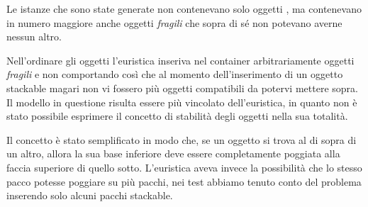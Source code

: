 Le istanze che sono state generate non contenevano solo oggetti , ma contenevano in numero maggiore anche oggetti \textit{fragili} che sopra di sé non potevano averne nessun altro. 

Nell'ordinare gli oggetti l'euristica inseriva nel container arbitrariamente oggetti \textit{fragili} e non comportando così che al momento dell'inserimento di un oggetto stackable magari non vi fossero più oggetti compatibili da potervi mettere sopra. Il modello in questione risulta essere più vincolato dell'euristica, in quanto non è stato possibile esprimere il concetto di stabilità degli oggetti nella sua totalità.

Il concetto è stato semplificato in modo che, se un oggetto si trova al di sopra di un altro, allora la sua base inferiore deve essere completamente poggiata alla faccia superiore di quello sotto. L'euristica aveva invece la possibilità che lo stesso pacco potesse poggiare su più pacchi, nei test abbiamo tenuto conto del problema inserendo solo alcuni pacchi stackable.